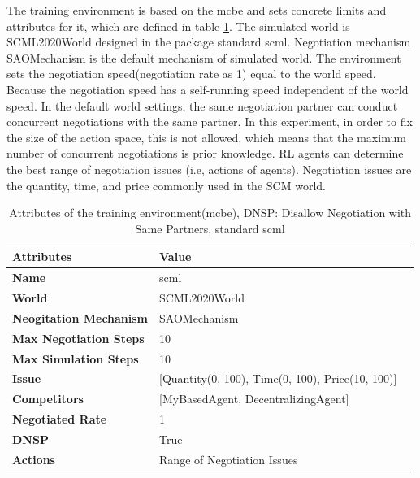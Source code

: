 The training environment is based on the \gls{mcbe} and sets concrete limits and attributes for it, which are defined in table \ref{tab:attributes-mcbe-dynamical-range-negotiation-issue}. The simulated world is SCML2020World designed in the package standard scml. Negotiation mechanism SAOMechanism is the default mechanism of simulated world. The environment sets the negotiation speed(negotiation rate as 1) equal to the world speed. Because the negotiation speed has a self-running speed independent of the world speed. In the default world settings, the same negotiation partner can conduct concurrent negotiations with the same partner. In this experiment, in order to fix the size of the action space, this is not allowed, which means that the maximum number of concurrent negotiations is prior knowledge. RL agents can determine the best range of negotiation issues (i.e, actions of agents). Negotiation issues are the quantity, time, and price commonly used in the SCM world.

\begin{table}[htbp]
\centering
\begin{tabular}{l l l} \toprule
\bfseries \textbf{Attributes}    & \bfseries \textbf{Value}                                             \\ \midrule
\textbf{Name}                    & scml                                                                 \\
\textbf{World}                   & SCML2020World                                                        \\
\textbf{Neogitation Mechanism}   & SAOMechanism                                                         \\
\textbf{Max Negotiation Steps}   & 10                                                                   \\
\textbf{Max Simulation Steps}    & 10                                                                   \\
\textbf{Issue}             	     & [Quantity(0, 100), Time(0, 100), Price(10, 100)]                     \\
\textbf{Competitors}             & [MyBasedAgent, DecentralizingAgent]                                  \\
\textbf{Negotiated Rate}         &    1                                                                 \\
\textbf{DNSP}                    &    True                             \\
\textbf{Actions}                 & Range of Negotiation Issues                                          \\
\bottomrule
\end{tabular}
\caption{Attributes of the training environment(mcbe), DNSP: Disallow Negotiation with Same Partners, standard scml}
\label{tab:attributes-mcbe-dynamical-range-negotiation-issue}
\end{table}

